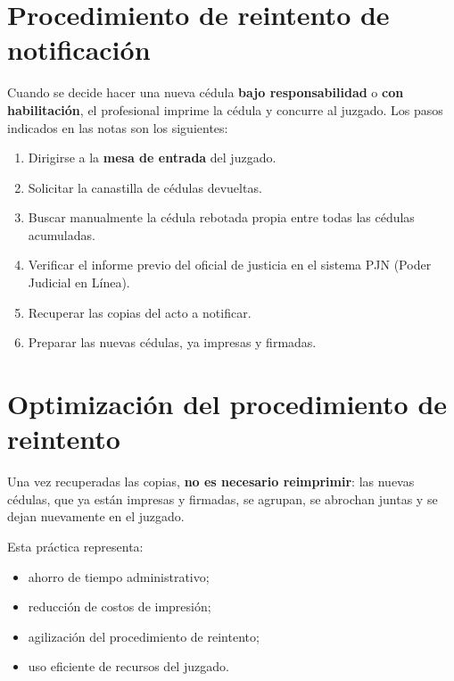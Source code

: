 \documentclass[12pt,oneside]{book}
\begin{document}
\section{Procedimiento de reintento de notificación}

Cuando se decide hacer una nueva cédula \textbf{bajo responsabilidad} o \textbf{con habilitación}, el profesional imprime la cédula y concurre al juzgado. Los pasos indicados en las notas son los siguientes:

\begin{enumerate}
    \item Dirigirse a la \textbf{mesa de entrada} del juzgado.
    \item Solicitar la canastilla de cédulas devueltas.
    \item Buscar manualmente la cédula rebotada propia entre todas las cédulas acumuladas.
    \item Verificar el informe previo del oficial de justicia en el sistema PJN (Poder Judicial en Línea).
    \item Recuperar las copias del acto a notificar.
    \item Preparar las nuevas cédulas, ya impresas y firmadas.
\end{enumerate}


\section{Optimización del procedimiento de reintento}

Una vez recuperadas las copias, \textbf{no es necesario reimprimir}: las nuevas cédulas, que ya están impresas y firmadas, se agrupan, se abrochan juntas y se dejan nuevamente en el juzgado.


Esta práctica representa:

\begin{itemize}
    \item ahorro de tiempo administrativo;
    \item reducción de costos de impresión;
    \item agilización del procedimiento de reintento;
    \item uso eficiente de recursos del juzgado.
\end{itemize}
\end{document}
